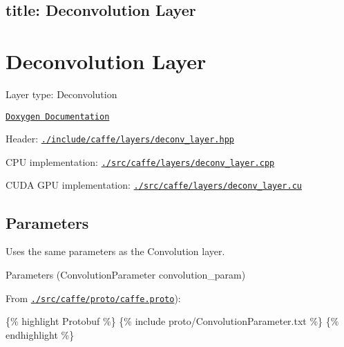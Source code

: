 

 \subsection*{title\+: Deconvolution Layer }

\section*{Deconvolution Layer}


\begin{DoxyItemize}
\item Layer type\+: {\ttfamily Deconvolution}
\item \href{http://caffe.berkeleyvision.org/doxygen/classcaffe_1_1DeconvolutionLayer.html}{\tt Doxygen Documentation}
\item Header\+: \href{https://github.com/BVLC/caffe/blob/master/include/caffe/layers/deconv_layer.hpp}{\tt {\ttfamily ./include/caffe/layers/deconv\+\_\+layer.hpp}}
\item C\+PU implementation\+: \href{https://github.com/BVLC/caffe/blob/master/src/caffe/layers/deconv_layer.cpp}{\tt {\ttfamily ./src/caffe/layers/deconv\+\_\+layer.cpp}}
\item C\+U\+DA G\+PU implementation\+: \href{https://github.com/BVLC/caffe/blob/master/src/caffe/layers/deconv_layer.cu}{\tt {\ttfamily ./src/caffe/layers/deconv\+\_\+layer.cu}}
\end{DoxyItemize}

\subsection*{Parameters}

Uses the same parameters as the Convolution layer.


\begin{DoxyItemize}
\item Parameters ({\ttfamily Convolution\+Parameter convolution\+\_\+param})
\item From \href{https://github.com/BVLC/caffe/blob/master/src/caffe/proto/caffe.proto}{\tt {\ttfamily ./src/caffe/proto/caffe.proto}})\+:
\end{DoxyItemize}

\{\% highlight Protobuf \%\} \{\% include proto/\+Convolution\+Parameter.\+txt \%\} \{\% endhighlight \%\} 